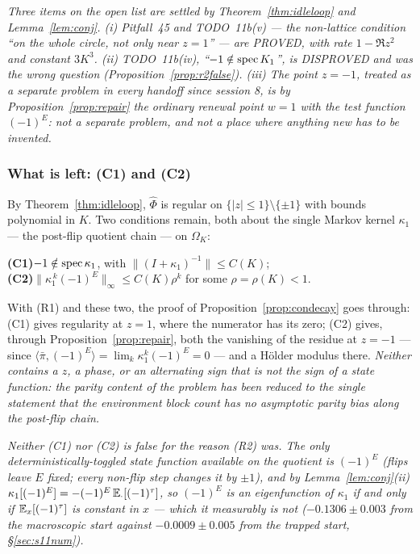 \emph{Three items on the open list are settled by
Theorem~\ref{thm:idleloop} and Lemma~\ref{lem:conj}.  (i) Pitfall~45
and TODO~11b(v) --- the non-lattice condition ``on the whole circle,
not only near $z=1$'' --- are PROVED, with rate $1-\Re z^2$ and
constant $3K^3$.  (ii) TODO~11b(iv), ``$-1\notin\operatorname{spec} K_1$'', is
DISPROVED and was the wrong question
(Proposition~\ref{prop:r2false}).  (iii) The point $z=-1$, treated as a
separate problem in every handoff since session 8, is by
Proposition~\ref{prop:repair} the ordinary renewal point $w=1$ with the
test function $(-1)^E$: not a separate problem, and not a place where
anything new has to be invented.}

\subsubsection{What is left: (C1) and (C2)}\label{sec:s11left}

By Theorem~\ref{thm:idleloop}, $\widehat\Phi$ is regular on
$\{|z|\le1\}\setminus\{\pm1\}$ with bounds polynomial in $K$.  Two
conditions remain, both about the single Markov kernel $\kappa_1$ ---
the post-flip quotient chain --- on $\Omega_K$:

\medskip
\noindent\textbf{(C1)}\quad$-1\notin\operatorname{spec}\kappa_1$, with
$\|(I+\kappa_1)^{-1}\|\le C(K)$;\\
\noindent\textbf{(C2)}\quad$\bigl\|\kappa_1^{\,k}(-1)^{E}\bigr\|_\infty
\le C(K)\rho^k$ for some $\rho=\rho(K)<1$.
\medskip

\noindent With (R1) and these two, the proof of
Proposition~\ref{prop:condecay} goes through: (C1) gives regularity at
$z=1$, where the numerator has its zero; (C2) gives, through
Proposition~\ref{prop:repair}, both the vanishing of the residue at
$z=-1$ --- since $\langle\bar\pi,(-1)^E\rangle=\lim_k\kappa_1^k(-1)^E=0$
--- and a Hölder modulus there.  \emph{Neither contains a $z$, a phase,
or an alternating sign that is not the sign of a state function: the
parity content of the problem has been reduced to the single statement
that the environment block count has no asymptotic parity bias along
the post-flip chain.}

\emph{Neither (C1) nor (C2) is false for the reason (R2) was.  The
only deterministically-toggled state function available on the quotient
is $(-1)^E$ (flips leave $E$ fixed; every non-flip step changes it by
$\pm1$), and by Lemma~\ref{lem:conj}(ii)
$\kappa_1[(-1)^E]=-(-1)^{E}\,\mathbb{E}_\cdot[(-1)^\tau]$, so $(-1)^E$ is an
eigenfunction of $\kappa_1$ if and only if $\mathbb{E}_x[(-1)^\tau]$ is
constant in $x$ --- which it measurably is not
($-0.1306\pm0.003$ from the macroscopic start against
$-0.0009\pm0.005$ from the trapped start, \S\ref{sec:s11num}).}

